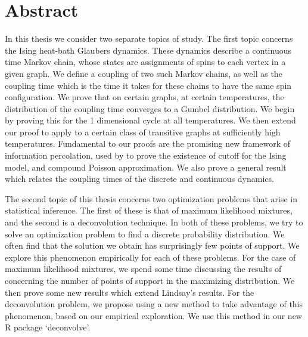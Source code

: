 \documentclass[11pt, oneside]{Thesis} %
\begin{document}
\chapter*{Abstract}

In this thesis we consider two separate topics of study. The first topic concerns the Ising heat-bath Glaubers dynamics. These dynamics describe a continuous time Markov chain, whose states are assignments of spins to each vertex in a given graph. We define a coupling of two such Markov chains, as well as the coupling time which is the time it takes for these chains to have the same spin configuration. We prove that on certain graphs, at certain temperatures, the distribution of the coupling time converges to a Gumbel distribution. We begin by proving this for the 1 dimensional cycle at all temperatures. We then extend our proof to apply to a certain class of transitive graphs at sufficiently high temperatures. Fundamental to our proofs are the promising new framework of information percolation, used by \citeauthor{Lubetzky2016-wd} to prove the existence of cutoff for the Ising model, and compound Poisson approximation. We also prove a general result which relates the coupling times of the discrete and continuous dynamics.

The second topic of this thesis concerns two optimization problems that arise in statistical inference. The first of these is that of maximum likelihood mixtures, and the second is a deconvolution technique. In both of these problems, we try to solve an optimization problem to find a discrete probability distribution. We often find that the solution we obtain has surprisingly few points of support. We explore this phenomenon empirically for each of these problems. For the case of maximum likelihood mixtures, we spend some time discussing the results of \citeauthor{Lindsay1983-tf} concerning the number of points of support in the maximizing distribution. We then prove some new results which extend Lindsay's results. For the deconvolution problem, we propose using a new method to take advantage of this phenomenon, based on our empirical exploration. We use this method in our new R package `deconvolve'.


\clearpage 

\end{document}
